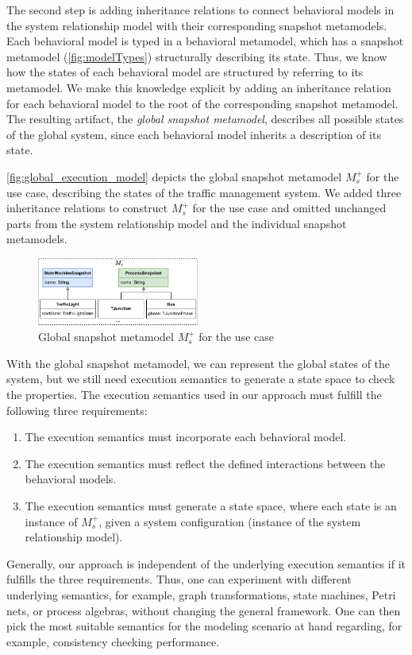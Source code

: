 \documentclass{jot}
\begin{document}
The second step is adding inheritance relations to connect behavioral models in the system relationship model with their corresponding snapshot metamodels.
Each behavioral model is typed in a behavioral metamodel, which has a snapshot metamodel (\autoref{fig:modelTypes}) structurally describing its state.
Thus, we know how the states of each behavioral model are structured by referring to its metamodel.
We make this knowledge explicit by adding an inheritance relation for each behavioral model to the root of the corresponding snapshot metamodel.
The resulting artifact, the \emph{global snapshot metamodel}, describes all possible states of the global system, since each behavioral model inherits a description of its state.

\autoref{fig:global_execution_model} depicts the global snapshot metamodel $M_s^+$ for the use case, describing the states of the traffic management system.
We added three inheritance relations to construct $M_s^+$ for the use case and omitted unchanged parts from the system relationship model and the individual snapshot metamodels.

\begin{figure}[h]
    \centering
    \includegraphics[width=0.475\textwidth]{figures/global_s_model.pdf}
    \caption{Global snapshot metamodel $M_s^+$ for the use case}
    \label{fig:global_execution_model}
\end{figure}

With the global snapshot metamodel, we can represent the global states of the system, but we still need execution semantics to generate a state space to check the properties.
The execution semantics used in our approach must fulfill the following three requirements:
\begin{enumerate}
    \item The execution semantics must incorporate each behavioral model.
    \item The execution semantics must reflect the defined interactions between the behavioral models.
    \item The execution semantics must generate a state space, where each state is an instance of $M_s^+$, given a system configuration (instance of the system relationship model).
\end{enumerate}
Generally, our approach is independent of the underlying execution semantics if it fulfills the three requirements.
Thus, one can experiment with different underlying semantics, for example, graph transformations, state machines, Petri nets, or process algebras, without changing the general framework.
One can then pick the most suitable semantics for the modeling scenario at hand regarding, for example, consistency checking performance.
\end{document}
